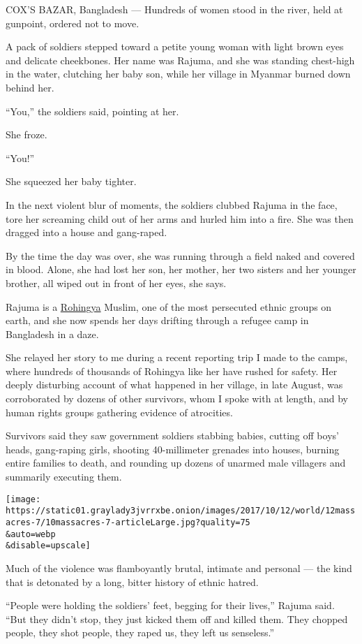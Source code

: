 COX'S BAZAR, Bangladesh --- Hundreds of women stood in the river, held
at gunpoint, ordered not to move.

A pack of soldiers stepped toward a petite young woman with light brown
eyes and delicate cheekbones. Her name was Rajuma, and she was standing
chest-high in the water, clutching her baby son, while her village in
Myanmar burned down behind her.

``You,'' the soldiers said, pointing at her.

She froze.

``You!''

She squeezed her baby tighter.

In the next violent blur of moments, the soldiers clubbed Rajuma in the
face, tore her screaming child out of her arms and hurled him into a
fire. She was then dragged into a house and gang-raped.

By the time the day was over, she was running through a field naked and
covered in blood. Alone, she had lost her son, her mother, her two
sisters and her younger brother, all wiped out in front of her eyes, she
says.

Rajuma is a
\href{https://www.nytimes3xbfgragh.onion/2017/09/13/world/asia/myanmar-rohingya-muslim.html}{Rohingya}
Muslim, one of the most persecuted ethnic groups on earth, and she now
spends her days drifting through a refugee camp in Bangladesh in a daze.

She relayed her story to me during a recent reporting trip I made to the
camps, where hundreds of thousands of Rohingya like her have rushed for
safety. Her deeply disturbing account of what happened in her village,
in late August, was corroborated by dozens of other survivors, whom I
spoke with at length, and by human rights groups gathering evidence of
atrocities.

Survivors said they saw government soldiers stabbing babies, cutting off
boys' heads, gang-raping girls, shooting 40-millimeter grenades into
houses, burning entire families to death, and rounding up dozens of
unarmed male villagers and summarily executing them.

\texttt{[image: https://static01.graylady3jvrrxbe.onion/images/2017/10/12/world/12massacres-7/10massacres-7-articleLarge.jpg?quality=75\\\&auto=webp\\\&disable=upscale]}

Much of the violence was flamboyantly brutal, intimate and personal ---
the kind that is detonated by a long, bitter history of ethnic hatred.

``People were holding the soldiers' feet, begging for their lives,''
Rajuma said. ``But they didn't stop, they just kicked them off and
killed them. They chopped people, they shot people, they raped us, they
left us senseless.''

